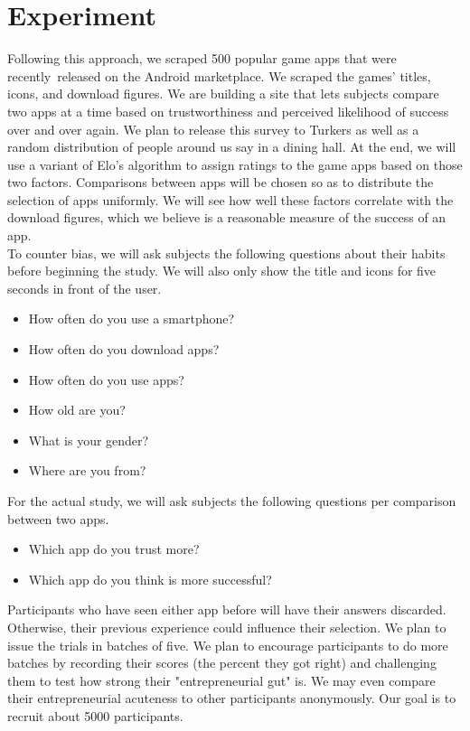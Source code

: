 \section{Experiment}


Following this approach, we scraped 500 popular game apps that were recently released on the Android marketplace. We scraped the games' titles, icons, and download figures. We are building a site that lets subjects compare two apps at a time based on trustworthiness and perceived likelihood of success over and over again. We plan to release this survey to Turkers as well as a random distribution of people around us say in a dining hall. At the end, we will use a variant of Elo's algorithm to assign ratings to the game apps based on those two factors. Comparisons between apps will be chosen so as to distribute the selection of apps uniformly. We will see how well these factors correlate with the download figures, which we believe is a reasonable measure of the success of an app. \\

To counter bias, we will ask subjects the following questions about their habits before beginning the study. We will also only show the title and icons for five seconds in front of the user.

\begin{itemize}
\item How often do you use a smartphone?
\item How often do you download apps?
\item How often do you use apps?
\item How old are you?
\item What is your gender?
\item Where are you from?
\end{itemize}

For the actual study, we will ask subjects the following questions per comparison between two apps.

\begin{itemize}
\item Which app do you trust more?
\item Which app do you think is more successful?
\end{itemize}

Participants who have seen either app before will have their answers discarded. Otherwise, their previous experience could influence their selection. We plan to issue the trials in batches of five. We plan to encourage participants to do more batches by recording their scores (the percent they got right) and challenging them to test how strong their "entrepreneurial gut" is. We may even compare their entrepreneurial acuteness to other participants anonymously. Our goal is to recruit about 5000 participants.
